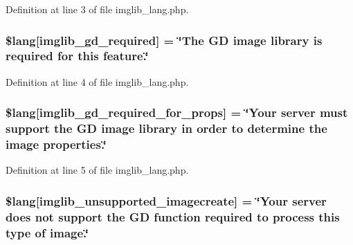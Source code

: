 Definition at line 3 of file imglib\+\_\+lang.\+php.

\subsubsection[{\texorpdfstring{\$lang}{$lang}}]{\setlength{\rightskip}{0pt plus 5cm}\$lang\mbox{[}\textquotesingle{}imglib\+\_\+gd\+\_\+required\textquotesingle{}\mbox{]} = \char`\"{}The GD image library is required {\bf for} {\bf this} feature.\char`\"{}}\hypertarget{application_2language_2russian_2imglib__lang_8php_aa8d7f8276e62fbe759daef2021c16552}{}\label{application_2language_2russian_2imglib__lang_8php_aa8d7f8276e62fbe759daef2021c16552}


Definition at line 4 of file imglib\+\_\+lang.\+php.

\subsubsection[{\texorpdfstring{\$lang}{$lang}}]{\setlength{\rightskip}{0pt plus 5cm}\$lang\mbox{[}\textquotesingle{}imglib\+\_\+gd\+\_\+required\+\_\+for\+\_\+props\textquotesingle{}\mbox{]} = \char`\"{}Your server must support the GD image library in order to determine the image properties.\char`\"{}}\hypertarget{application_2language_2russian_2imglib__lang_8php_a0da9c99f9e2b5f38ccbefb9d9f702c5e}{}\label{application_2language_2russian_2imglib__lang_8php_a0da9c99f9e2b5f38ccbefb9d9f702c5e}


Definition at line 5 of file imglib\+\_\+lang.\+php.

\subsubsection[{\texorpdfstring{\$lang}{$lang}}]{\setlength{\rightskip}{0pt plus 5cm}\$lang\mbox{[}\textquotesingle{}imglib\+\_\+unsupported\+\_\+imagecreate\textquotesingle{}\mbox{]} = \char`\"{}Your server does not support the GD function required to process {\bf this} {\bf type} of image.\char`\"{}}\hypertarget{application_2language_2russian_2imglib__lang_8php_ace032cbe8dafb1f3417a758d0914ecdb}{}\label{application_2language_2russian_2imglib__lang_8php_ace032cbe8dafb1f3417a758d0914ecdb}


